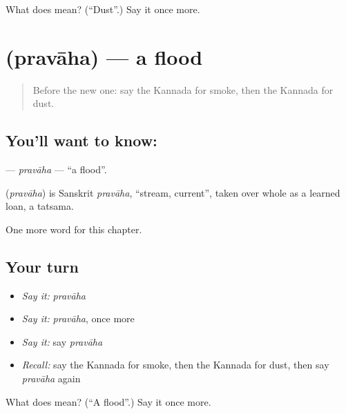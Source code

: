 \begin{tcolorbox}[breakable,colback=teal!4,colframe=teal!35!black,title={Before you move on}]
What does  mean? (\textquotedblleft{}Dust\textquotedblright{}.) Say it once more.
\end{tcolorbox}
\section[\texorpdfstring{\kn{ಪ್ರವಾಹ} (pravāha)}{ಪ್ರವಾಹ (pravāha)}]{ (pravāha) — a flood}

\label{lesson:KA-C224-pravaha}



\begin{quote}
Before the new one: say the Kannada for smoke, then the Kannada for dust.
\end{quote}

\subsection*{You'll want to know: }
\textbf{} — \emph{pravāha} — \textquotedblleft{}a flood\textquotedblright{}.

\begin{cousinweb}
\textbf{} (\emph{pravāha}) is Sanskrit \emph{pravāha}, \textquotedblleft{}stream, current\textquotedblright{}, taken over whole as a learned loan, a tatsama.
\end{cousinweb}

\begin{grammarlens}[title={What you've built}]
One more word for this chapter.
\end{grammarlens}

\subsection*{Your turn}
\begin{itemize}
\raggedright
  \item \emph{Say it:} \emph{pravāha}
  \item \emph{Say it:} \emph{pravāha}, once more
  \item \emph{Say it:} say \emph{pravāha}
  \item \emph{Recall:} say the Kannada for smoke, then the Kannada for dust, then say \emph{pravāha} again
\end{itemize}

\begin{tcolorbox}[breakable,colback=teal!4,colframe=teal!35!black,title={Before you move on}]
What does  mean? (\textquotedblleft{}A flood\textquotedblright{}.) Say it once more.
\end{tcolorbox}
